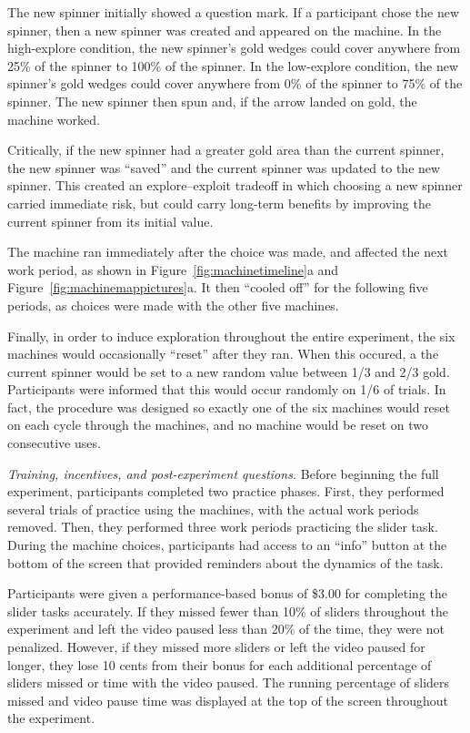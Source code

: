 \documentclass[10pt,letterpaper]{article}
\begin{document}
The new spinner initially showed a question mark. If a participant chose the
new spinner, then a new spinner was
created and appeared on the machine. In the high-explore condition, the new spinner's gold wedges could cover
anywhere from 25\% of the spinner to 100\% of the spinner. In the low-explore condition, the new spinner's gold wedges could cover
anywhere from 0\% of the spinner to 75\% of the spinner. The new spinner then
spun and, if the arrow landed on gold, the machine worked.

Critically, if the new spinner had a greater gold area than the current
spinner, the new spinner was ``saved'' and the current spinner was
updated to the new spinner.  This created an explore--exploit tradeoff in which 
choosing a new spinner carried immediate risk, but could carry long-term
benefits by improving the current spinner from its initial value.

The machine ran immediately after the choice was
made, and affected the next work period, as shown in
Figure~\ref{fig:machinetimeline}a and Figure~\ref{fig:machinemappictures}a. It then ``cooled off'' for the
following five periods, as choices were made with the other five machines.

Finally, in order to induce exploration throughout the entire experiment, the
six machines would occasionally ``reset'' after they ran. When this occured, a
the current spinner would be set to a new random value between 1/3 and 2/3 gold.
Participants were informed that this would occur randomly on
1/6 of trials. In fact, the procedure was designed so exactly one of the six
machines would reset on each cycle through the machines, and no machine would be
reset on two consecutive uses.



\emph{Training, incentives, and post-experiment questions.}
Before beginning the full experiment, participants completed two
practice phases. First, they performed several trials of practice using the
machines, with the actual work periods removed. Then, they performed three work
periods practicing the slider task.
During the machine choices, participants had access to an ``info'' button at the
bottom of the screen that provided reminders about the dynamics of the task.

Participants were given a performance-based bonus of \$3.00 for completing the
slider tasks accurately. If they missed fewer than 10\% of sliders throughout
the experiment and left the video paused less than 20\% of the time, they were
not penalized. However, if they missed more sliders or left the video paused for
longer, they lose 10 cents from their bonus for each additional percentage of
sliders missed or time with the video paused. The running percentage of sliders
missed and video pause time was displayed at the top of the screen throughout
the experiment.
\end{document}
